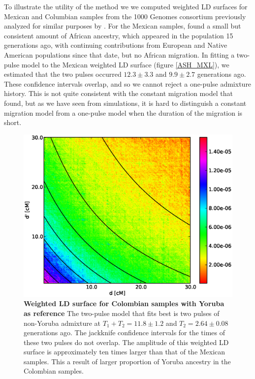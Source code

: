 \begin{table}
\begin{table}
To illustrate the utility of the method we we computed weighted LD surfaces for
Mexican and Columbian samples from the 1000 Genomes consortium previously
analyzed for similar purposes by \cite{gravel2013reconstructing}. For the
Mexican samples, \cite{gravel2013reconstructing} found a small but consistent
amount of African ancestry, which appeared in the population 15 generations ago,
with continuing contributions from European and Native American populations
since that date, but no African migration. In fitting a two-pulse model to the
Mexican weighted LD surface (figure \ref{ASH_MXL}), we estimated that the two
pulses occurred $12.3\pm3.3$ and $9.9\pm2.7$ generations ago. These confidence
intervals overlap, and so we cannot reject a one-pulse admixture history. This
is not quite consistent with the constant migration model that
\cite{gravel2013reconstructing} found, but as we have seen from simulations, it
is hard to distinguish a constant migration model from a one-pulse model when
the duration of the migration is short.

\begin{figure} \includegraphics[scale=.6]{CLM.eps} \caption{ {\bf Weighted LD
surface for Colombian samples with Yoruba as reference} The two-pulse model that
fits best is two pulses of non-Yoruba admixture at $T_1+T_2=11.8\pm 1.2$ and
$T_2=2.64 \pm 0.08$ generations ago. The jackknife confidence intervals for the
times of these two pulses do not overlap. The amplitude of this weighted LD
surface is approximately ten times larger than that of the Mexican samples. This
a result of larger proportion of Yoruba ancestry in the Colombian samples. }
\label{ASH_CLM} \end{figure}


\end{table}
\end{table}

